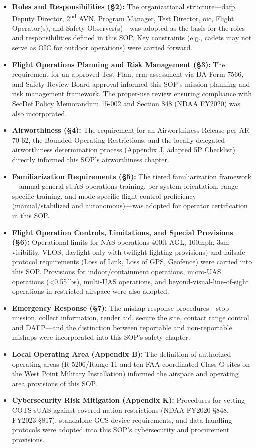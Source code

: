         \begin{itemize}
            \item \textbf{Roles and Responsibilities ({\S}2):} The organizational structure---\ac{dafp}, Deputy Director, 2\textsuperscript{nd} AVN, Program Manager, Test Director, \ac{oic}, Flight Operator(s), and Safety Observer(s)---was adopted as the basis for the roles and responsibilities defined in this SOP.  Key constraints (e.g., cadets may not serve as OIC for outdoor operations) were carried forward.
            \item \textbf{Flight Operations Planning and Risk Management ({\S}3):} The requirement for an approved Test Plan, \ac{crm} assessment via DA Form 7566, and Safety Review Board approval informed this SOP's mission planning and risk management framework.  The proper-use review ensuring compliance with SecDef Policy Memorandum 15-002 and Section 848 (NDAA FY2020) was also incorporated.
            \item \textbf{Airworthiness ({\S}4):} The requirement for an Airworthiness Release per AR 70-62, the Bounded Operating Restrictions, and the locally delegated airworthiness determination process (Appendix J, adapted 5P Checklist) directly informed this SOP's airworthiness chapter.
            \item \textbf{Familiarization Requirements ({\S}5):} The tiered familiarization framework---annual general sUAS operations training, per-system orientation, range-specific training, and mode-specific flight control proficiency (manual/stabilized and autonomous)---was adopted for operator certification in this SOP.
            \item \textbf{Flight Operation Controls, Limitations, and Special Provisions ({\S}6):} Operational limits for NAS operations 400ft AGL, 100mph, 3sm visibility, VLOS, daylight-only with twilight lighting provisions) and failsafe protocol requirements (Loss of Link, Loss of GPS, Geofence) were carried into this SOP.  Provisions for indoor/containment operations, micro-UAS operations (\textless0.55\,lbs), multi-UAS operations, and beyond-visual-line-of-sight operations in restricted airspace were also adopted.
            \item \textbf{Emergency Response ({\S}7):} The mishap response procedures---stop mission, collect information, render aid, secure the site, contact range control and DAFP---and the distinction between reportable and non-reportable mishaps were incorporated into this SOP's safety chapter.
            \item \textbf{Local Operating Area (Appendix B):} The definition of authorized operating areas (R-5206/Range 11 and ten FAA-coordinated Class G sites on the West Point Military Installation) informed the airspace and operating area provisions of this SOP.
            \item \textbf{Cybersecurity Risk Mitigation (Appendix K):} Procedures for vetting COTS sUAS against covered-nation restrictions (NDAA FY2020 {\S}848, FY2023 {\S}817), standalone GCS device requirements, and data handling protocols were adopted into this SOP's cybersecurity and procurement provisions.
        \end{itemize}

